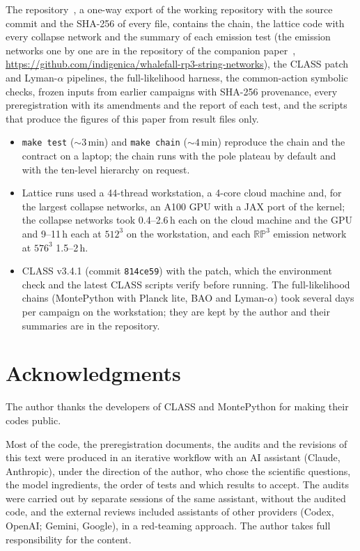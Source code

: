 \documentclass[11pt,a4paper]{article}
\newcommand{\RP}{\mathbb{RP}^3}
\begin{document}
The repository~\cite{whalefall_chain}, a one-way export of the working repository with the source commit and the SHA-256 of every file, contains the chain, the lattice code with every collapse network and the summary of each emission test (the emission networks one by one are in the repository of the companion paper~\cite{rp3_paper}, \url{https://github.com/indigenica/whalefall-rp3-string-networks}), the CLASS patch and Lyman-$\alpha$ pipelines, the full-likelihood harness, the common-action symbolic checks, frozen inputs from earlier campaigns with SHA-256 provenance, every preregistration with its amendments and the report of each test, and the scripts that produce the figures of this paper from result files only.
\begin{itemize}
\item \texttt{make test} ($\sim3$\,min) and \texttt{make chain} ($\sim4$\,min) reproduce the chain and the contract on a laptop; the chain runs with the pole plateau by default and with the ten-level hierarchy on request.
\item Lattice runs used a 44-thread workstation, a 4-core cloud machine and, for the largest collapse networks, an A100 GPU with a JAX port of the kernel; the collapse networks took 0.4--2.6\,h each on the cloud machine and the GPU and 9--11\,h each at $512^3$ on the workstation, and each $\RP$ emission network at $576^3$ 1.5--2\,h.
\item CLASS v3.4.1 (commit \texttt{814ce59}) with the patch, which the environment check and the latest CLASS scripts verify before running. The full-likelihood chains (MontePython with Planck lite, BAO and Lyman-$\alpha$) took several days per campaign on the workstation; they are kept by the author and their summaries are in the repository.
\end{itemize}

\section*{Acknowledgments}

The author thanks the developers of CLASS and MontePython for making their codes public.

Most of the code, the preregistration documents, the audits and the revisions of this text were produced in an iterative workflow with an AI assistant (Claude, Anthropic), under the direction of the author, who chose the scientific questions, the model ingredients, the order of tests and which results to accept.
The audits were carried out by separate sessions of the same assistant, without the audited code, and the external reviews included assistants of other providers (Codex, OpenAI; Gemini, Google), in a red-teaming approach.
The author takes full responsibility for the content.
\end{document}
